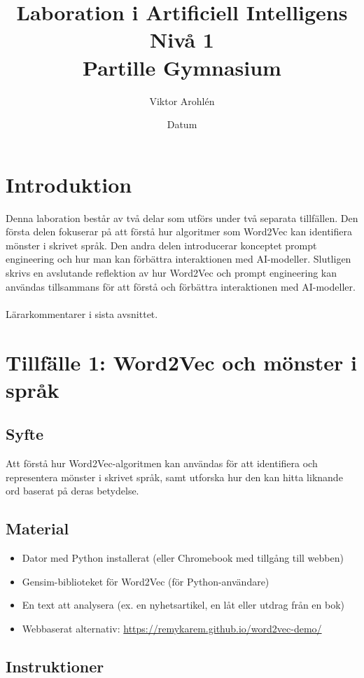 \documentclass[a4paper, 12pt]{article}
\title{Laboration i Artificiell Intelligens Nivå 1 \\ \large Partille Gymnasium}
\author{Viktor Arohlén}
\date{Datum}
\begin{document}
\maketitle

\section*{Introduktion}
Denna laboration består av två delar som utförs under två separata tillfällen. Den första delen fokuserar på att förstå hur algoritmer som Word2Vec kan identifiera mönster i skrivet språk. Den andra delen introducerar konceptet prompt engineering och hur man kan förbättra interaktionen med AI-modeller.
Slutligen skrivs en avslutande reflektion av hur Word2Vec och prompt engineering kan användas tillsammans för att förstå och förbättra interaktionen med AI-modeller.
\\ \\ Lärarkommentarer i sista avsnittet.


\section{Tillfälle 1: Word2Vec och mönster i språk}

\subsection{Syfte}
Att förstå hur Word2Vec-algoritmen kan användas för att identifiera och representera mönster i skrivet språk, samt utforska hur den kan hitta liknande ord baserat på deras betydelse.

\subsection{Material}
\begin{itemize}
    \item Dator med Python installerat (eller Chromebook med tillgång till webben)
    \item Gensim-biblioteket för Word2Vec (för Python-användare)
    \item En text att analysera (ex. en nyhetsartikel, en låt eller utdrag från en bok)
    \item Webbaserat alternativ: \url{https://remykarem.github.io/word2vec-demo/}
\end{itemize}
\break
\subsection{Instruktioner}
\end{document}
